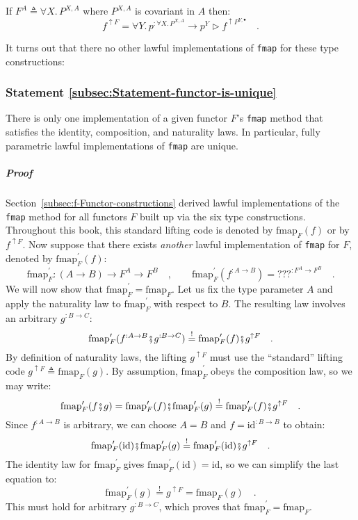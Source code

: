 If $F^{A}\triangleq\forall X.\,P^{X,A}$ where $P^{X,A}$ is covariant
in $A$ then: 
\[
f^{\uparrow F}=\forall Y.\,p^{:\forall X.\,P^{X,A}}\rightarrow p^{Y}\triangleright f^{\uparrow P^{Y,\bullet}}\quad.
\]

It turns out that there no other lawful implementations of \lstinline!fmap!
for these type constructions:

\subsubsection{Statement \label{subsec:Statement-functor-is-unique}\ref{subsec:Statement-functor-is-unique}}

There is only one implementation of a given functor $F$\textsf{'}s \lstinline!fmap!
method that satisfies the identity, composition, and naturality laws.
In particular, fully parametric lawful implementations of \lstinline!fmap!
are unique.

\subparagraph{Proof}

Section~\ref{subsec:f-Functor-constructions} derived lawful implementations
of the \lstinline!fmap! method for all functors $F$ built up via
the six type constructions. Throughout this book, this standard lifting
code is denoted by $\text{fmap}_{F}(f)$ or by $f^{\uparrow F}$.
Now suppose that there exists \emph{another} lawful implementation
of \lstinline!fmap! for $F$, denoted by $\text{fmap}_{F}^{\prime}(f)$:
\[
\text{fmap}_{F}^{\prime}:\left(A\rightarrow B\right)\rightarrow F^{A}\rightarrow F^{B}\quad,\quad\quad\text{fmap}_{F}^{\prime}(f^{:A\rightarrow B})=\text{???}^{:F^{A}\rightarrow F^{B}}\quad.
\]
We will now show that $\text{fmap}_{F}^{\prime}=\text{fmap}_{F}$.
Let us fix the type parameter $A$ and apply the naturality law to
$\text{fmap}_{F}^{\prime}$ with respect to $B$. The resulting law
involves an arbitrary $g^{:B\rightarrow C}$:
\[
\text{fmap}_{F}^{\prime}(f^{:A\rightarrow B}\bef g^{:B\rightarrow C})\overset{!}{=}\text{fmap}_{F}^{\prime}(f)\bef g^{\uparrow F}\quad.
\]
By definition of naturality laws, the lifting $g^{\uparrow F}$ must
use the \textsf{``}standard\textsf{''} lifting code $g^{\uparrow F}\triangleq\text{fmap}_{F}(g)$.
By assumption, $\text{fmap}_{F}^{\prime}$ obeys the composition law,
so we may write:
\[
\text{fmap}_{F}^{\prime}(f\bef g)=\text{fmap}_{F}^{\prime}(f)\bef\text{fmap}_{F}^{\prime}(g)\overset{!}{=}\text{fmap}_{F}^{\prime}(f)\bef g^{\uparrow F}\quad.
\]
Since $f^{:A\rightarrow B}$ is arbitrary, we can choose $A=B$ and
$f=\text{id}^{:B\rightarrow B}$ to obtain:
\[
\text{fmap}_{F}^{\prime}(\text{id})\bef\text{fmap}_{F}^{\prime}(g)\overset{!}{=}\text{fmap}_{F}^{\prime}(\text{id})\bef g^{\uparrow F}\quad.
\]
The identity law for $\text{fmap}_{F}^{\prime}$ gives $\text{fmap}_{F}^{\prime}(\text{id})=\text{id}$,
so we can simplify the last equation to:
\[
\text{fmap}_{F}^{\prime}(g)\overset{!}{=}g^{\uparrow F}=\text{fmap}_{F}(g)\quad.
\]
This must hold for arbitrary $g^{:B\rightarrow C}$, which proves
that $\text{fmap}_{F}^{\prime}=\text{fmap}_{F}$.

